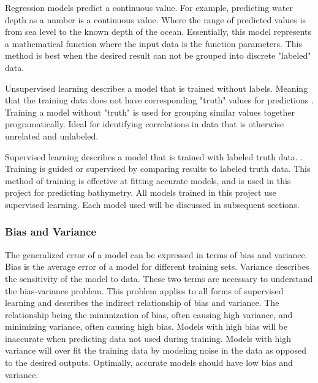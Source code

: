 \par
Regression models predict a continuous value.
For example, predicting water depth as a number is a continuous value.
Where the range of predicted values is from sea level to the known depth of the ocean.
Essentially, this model represents a mathematical function where the input data is the function parameters.
This method is best when the desired result can not be grouped into discrete "labeled" data.

\par
Unsupervised learning describes a model that is trained without labels.
Meaning that the training data does not have corresponding "truth" values for predictions \cite{bishop2006pattern}.
Training a model without "truth" is used for grouping similar values together programatically.
Ideal for identifying correlations in data that is otherwise unrelated and unlabeled.

\par
Supervised learning describes a model that is trained with labeled truth data. \cite{bishop2006pattern}.
Training is guided or supervised by comparing results to labeled truth data.
This method of training is effective at fitting accurate models, and is used in this project for predicting bathymetry.
All models trained in this project use supervised learning.
Each model used will be discussed in subsequent sections.

\subsubsection{Bias and Variance}
The generalized error of a model can be expressed in terms of bias and variance.
Bias is the average error of a model for different training sets.
Variance describes the sensitivity of the model to data.
These two terms are necessary to understand the bias-variance problem.
This problem applies to all forms of supervised learning \cite{geman1992neural} and describes the indirect relationship of bias and variance.
The relationship being the minimization of bias, often causing high variance, and minimizing variance, often causing high bias.
Models with high bias will be inaccurate when predicting data not used during training.
Models with high variance will over fit \cite{cawley2010over} the training data by modeling noise in the data as opposed to the desired outputs.
Optimally, accurate models should have low bias and variance.

